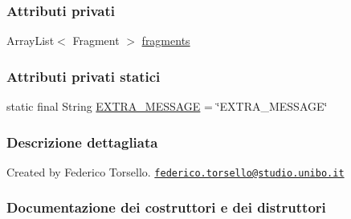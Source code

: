 \subsubsection*{Attributi privati}
\begin{DoxyCompactItemize}
\item 
Array\+List$<$ Fragment $>$ \hyperlink{classit_1_1unibo_1_1torsello_1_1bluetoothpositioning_1_1adapter_1_1StatePagerAdapter_a6d30ff8266b65b268d46d03eb30da1db_a6d30ff8266b65b268d46d03eb30da1db}{fragments}
\end{DoxyCompactItemize}
\subsubsection*{Attributi privati statici}
\begin{DoxyCompactItemize}
\item 
static final String \hyperlink{classit_1_1unibo_1_1torsello_1_1bluetoothpositioning_1_1adapter_1_1StatePagerAdapter_ac9b774a91ff682b603f6f2ef409c4bf2_ac9b774a91ff682b603f6f2ef409c4bf2}{E\+X\+T\+R\+A\+\_\+\+M\+E\+S\+S\+A\+GE} = \char`\"{}E\+X\+T\+R\+A\+\_\+\+M\+E\+S\+S\+A\+GE\char`\"{}
\end{DoxyCompactItemize}


\subsubsection{Descrizione dettagliata}
Created by Federico Torsello. \href{mailto:federico.torsello@studio.unibo.it}{\tt federico.\+torsello@studio.\+unibo.\+it} 

\subsubsection{Documentazione dei costruttori e dei distruttori}
\hypertarget{classit_1_1unibo_1_1torsello_1_1bluetoothpositioning_1_1adapter_1_1StatePagerAdapter_afd334cc5759e5d948cc53f04e3b595dc_afd334cc5759e5d948cc53f04e3b595dc}{}\label{classit_1_1unibo_1_1torsello_1_1bluetoothpositioning_1_1adapter_1_1StatePagerAdapter_afd334cc5759e5d948cc53f04e3b595dc_afd334cc5759e5d948cc53f04e3b595dc} 
